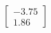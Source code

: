 \documentclass[preview]{standalone}
\begin{document}
\begin{align*}
\begin{bmatrix} -3.75 \\ 1.86 \end{bmatrix}
\end{align*}
\end{document}
